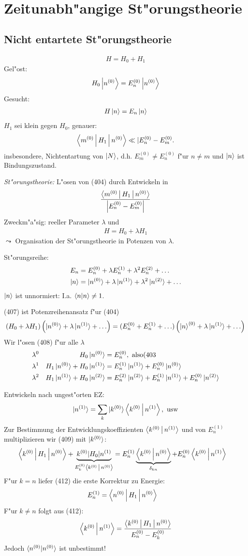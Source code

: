 \documentclass[a4paper]{scrartcl}
\newcommand{\eqn}[1]{\begin{align} #1 \end{align}}
\newcommand{\spl}[1]{\begin{split} #1 \end{split}}
\begin{document}
{\section{Zeitunabh"angige St"orungstheorie}

\subsection{Nicht entartete St"orungstheorie}

\eqn{H = H_0 + H_1}
Gel"ost:
\eqn{H_0 \Ket{n^{(0)}} = E_n^{(0)} \Ket{ n^{(0)}}}
Gesucht:
\eqn{ H\Ket n = E_n \Ket n}
$H_1$ sei klein gegen $H_0$, genauer:
\eqn{\Braket{ m^{(0)} | H_1 | n^{(0)} } \ll \vert E_n^{(0)} - E_m^{(0)}.}
insbesondere, Nichtentartung von $\Ket N$, d.h. $E_m^{(0)} \neq E_n^{(0)}$ f"ur $n \neq m$ und $\Ket n$ ist Bindungszustand.

\emph{St"orungstheorie:} L"osen von (404) durch Entwickeln in 
$$\frac{ \Braket{ m^{(0)} | H_1 | n^{(0)}} }{\left\vert E_n^{(0)} - E_m^{(0)} \right\vert}$$
Zweckm"a"sig: reeller Parameter $\lambda$ und
\eqn{H = H_0 + \lambda H_1 }
$\leadsto$ Organisation der St"orungstheorie in Potenzen von $\lambda$. 

St"orungsreihe:
\eqn{ \spl{ E_n & = E_n^{(0)} + \lambda E_n^{(1)} + \lambda^2 E_n^{(2)} + \ldots \\
\ket n & = \ket{ n^{(0)}} + \lambda \ket{ n^{(1)}} + \lambda^2 \ket{n^{(2)}} + \ldots }}
$\Ket n$ ist unnormiert: I.a. $\braket {n | n } \neq 1$.

(407) ist Potenzreihenansatz f"ur (404)
\eqn{ ( H_0 + \lambda H_1) \left( \ket{ n^{(0)}} + \lambda \ket{n^{(1)}} + \ldots \right) = (E_n^{(0)} + E_n^{(1)} + \ldots )\left(\ket n^{(0)} + \lambda \ket{n^{(1)}} + \ldots \right) }
Wir l"osen (408) f"ur alle $\lambda$
\eqn{ 
\lambda^0 & & H_0 \ket{ n^{(0)}} & = E_n^{(0)} \mathrm{, \ also (403} \notag\\
\lambda^1 & & H_1 \ket{ n^{(0)}} + H_0 \ket{n^{(1)}} & = E_n^{(1)} \ket{n^{(1)}} + E_n^{(0)} \ket{ n^{(0)}} \\
\lambda^2 & & H_1 \ket{ n^{(1)}} + H_0 \ket{n^{(2)}} & = E_n^{(2)} \ket{ n^{(2)}} + E_n^{(1)} \ket{n^{(1)}} + E_n^{(0)} \ket{ n^{(2)}}}
}
Entwickeln nach ungest"orten EZ:
\eqn{\ket{n^{(1)}} = \sum_k \ket{ k^{(0)}} \Braket{ k^{(0)} | n^{(1)}} \mathrm{, \ usw}}
Zur Bestimmung der Entwicklungskoeffizienten $\Braket{ k^{(0)} | n^{(1)}}$ und von $E_n^{(1)}$ multiplizieren wir (409) mit $\ket{ k^{(0)}}$:
\eqn{ \Braket{ k^{(0)} | H_1 | n^{(0)}} + \underbrace{ k^{(0)} | H_0 | n^{(1)}}_{E_k^{(0)} \Braket{ k^{(0)} | n^{(0)}}} & = E_n^{(1)} \underbrace{ \Braket{ k^{(0)} | n^{(0)}} }_{\delta_{kn}} + E_n^{(0)} \Braket{ k^{(0)} | n^{(1)}}}
F"ur $k=n$ liefer (412) die erste Korrektur zu Energie:
\eqn{ E_n^{(1)} & = \Braket{ n^{(0)} | H_1 | n^{(0)}}}
F"ur $k \neq n$ folgt aus (412):
\eqn{ \Braket{ k^{(0)} | n^{(1)}} = \frac{ \Braket{ k^{(0)} | H_1 | n^{(0)}} }{E_n^{(0)} -E_k^{(0)}}}
Jedoch $\braket{ n^{(0)} | n^{(0)}}$ ist unbestimmt!
\end{document}
